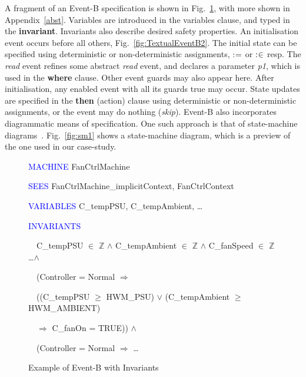 \documentclass{llncs}%
\begin{document}
A fragment of an Event-B specification is shown in Fig.~\ref{fig:TextualEventB}, with more shown in Appendix~\ref{abst}. Variables are introduced in the variables clause, and typed in the \textbf{invariant}. Invariants also describe desired safety properties. An initialisation event occurs before all others, Fig.~\ref{fig:TextualEventB2}. The initial state can be specified using deterministic or non-deterministic assignments, $\mathrel{:\mkern1mu=}$ or $\mathrel{:\mkern1mu\in}$ resp.  The \emph{read} event refines some abstract \emph{read} event, and declares a parameter \emph{p1}, which is used in the \textbf{where} clause. Other event guards may also appear here. After initialisation, any enabled event with all its guards true may occur. State updates are specified in the \textbf{then} (action) clause using deterministic or non-deterministic assignments, or the event may do nothing (\emph{skip}). Event-B also incorporates diagrammatic means of specification. One such approach is that of state-machine diagrams~\cite{snookIUMLB}. Fig.~\ref{fig:sm1} shows a state-machine diagram, which is a preview of the one used in our case-study.  
%
%
%
\begin{figure}
\centering
\begin{minipage}{0.9\linewidth}
\textcolor{blue}{MACHINE} FanCtrlMachine 

\textcolor{blue}{SEES} FanCtrlMachine\_implicitContext, FanCtrlContext 

\textcolor{blue}{VARIABLES} C\_tempPSU, C\_tempAmbient, \ldots \ \  \ 

\textcolor{blue}{INVARIANTS}

\ \ C\_tempPSU ${\in}$ $\mathbb{Z}$  ${\wedge}$ C\_tempAmbient ${\in}$ $\mathbb{Z}$  ${\wedge}$ C\_fanSpeed ${\in}$ $\mathbb{Z}$ \ldots ${\wedge}$ \ 

\ \ (Controller = Normal $\Rightarrow $ \

 \ \ ((C\_tempPSU ${\geq}$ HWM\_PSU) ${\vee}$ (C\_tempAmbient ${\geq}$
HWM\_AMBIENT)\

\ \ \quad $\Rightarrow $ C\_fanOn = TRUE)) ${\wedge}$\ \  \ 

\ \ (Controller = Normal $\Rightarrow $ \dots
\end{minipage}
	\caption{Example of Event-B with Invariants}
	\label{fig:TextualEventB}
\end{figure}
%
%
%
\end{document}
